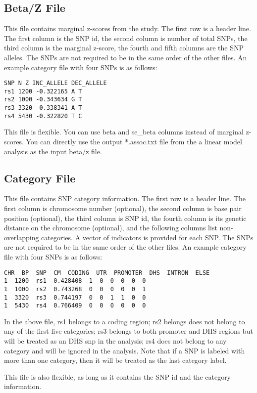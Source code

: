 \documentclass[11pt]{article}
\begin{document}
\subsection{Beta/Z File}

This file contains marginal z-scores from the study. The first row is
a header line. The first column is the SNP id, the second column is
number of total SNPs, the third column is the marginal z-score, the
fourth and fifth columns are the SNP alleles. The SNPs are not
required to be in the same order of the other files. An example
category file with four SNPs is as follows:
%
\begin{verbatim}
SNP N Z INC_ALLELE DEC_ALLELE
rs1 1200 -0.322165 A T
rs2 1000 -0.343634 G T
rs3 3320 -0.338341 A T
rs4 5430 -0.322820 T C
\end{verbatim}
%
This file is flexible. You can use beta and se\_beta columns instead
of marginal z-scores. You can directly use the output *.assoc.txt file
from the a linear model analysis as the input beta/z file.

\subsection{Category File}

This file contains SNP category information. The first row is a header
line. The first column is chromosome number (optional), the second
column is base pair position (optional), the third column is SNP id,
the fourth column is its genetic distance on the chromosome
(optional), and the following columns list non-overlapping
categories. A vector of indicators is provided for each SNP. The SNPs
are not required to be in the same order of the other files. An
example category file with four SNPs is as follows:
%
\begin{verbatim}
CHR  BP  SNP  CM  CODING  UTR  PROMOTER  DHS  INTRON  ELSE
1  1200  rs1  0.428408  1  0  0  0  0  0
1  1000  rs2  0.743268  0  0  0  0  0  1
1  3320  rs3  0.744197  0  0  1  1  0  0
1  5430  rs4  0.766409  0  0  0  0  0  0
\end{verbatim}
%
In the above file, rs1 belongs to a coding region; rs2 belongs does
not belong to any of the first five categories; rs3 belongs to both
promoter and DHS regions but will be treated as an DHS snp in the
analysis; rs4 does not belong to any category and will be ignored in
the analysis. Note that if a SNP is labeled with more than one
category, then it will be treated as the last category label.

This file is also flexible, as long as it contains the SNP id and the
category information.
\end{document}
